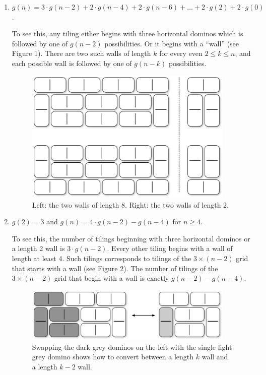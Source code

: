 \documentclass[12pt]{article}
\begin{document}
\begin{enumerate}
\item $g(n) = 3 \cdot g(n-2) + 2 \cdot g(n-4) + 2 \cdot g(n-6) + \ldots + 2 \cdot g(2) + 2 \cdot g(0)$.

  To see this, any tiling either begins with three horizontal dominos which is followed by one of $g(n-2)$ possibilities. Or it begins with a ``wall'' (see Figure 1).
  There are two such walls of length $k$ for every even $2 \leq k \leq n$, and each possible wall is followed by one of $g(n-k)$ possibilities.

  \begin{figure}[hbp]
    \begin{center}
      \includegraphics[width=100mm]{Figures/walls.eps}
      \end{center}
    \caption{Left: the two walls of length 8. Right: the two walls of length 2.}
  \end{figure}

\item $g(2) = 3$ and $g(n) = 4 \cdot g(n-2) - g(n-4)$ for $n \geq 4$.

  To see this, the number of tilings beginning with three horizontal dominos or a length 2 wall is $3 \cdot g(n-2)$. Every other tiling begins with a wall of length
  at least 4. Such tilings corresponds to tilings of the $3 \times (n-2)$ grid that starts with a wall (see Figure 2). The number of tilings of the $3 \times (n-2)$ grid
  that begin with a wall is exactly $g(n-2) - g(n-4)$.

    \begin{figure}[hbp]
    \begin{center}
      \includegraphics[width=100mm]{Figures/walls2.eps}
      \end{center}
    \caption{Swapping the dark grey dominos on the left with the single light grey domino shows how to convert between a length $k$ wall and a length $k-2$ wall.}
\end{figure}
\end{enumerate}
\vfill~
\end{document}
